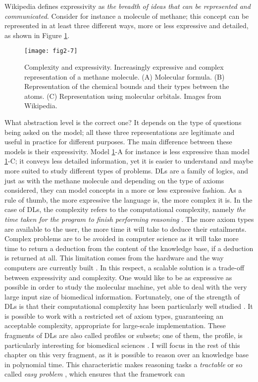 Wikipedia defines expressivity as \emph{the breadth of ideas that can be represented and communicated}. Consider for instance a molecule of methane; this concept can be represented in at least three different ways, more or less expressive and detailed, as shown in Figure \ref{fig2-7}.

\begin{figure}[ht]
    \centering
    \texttt{[image: fig2-7]}
    \caption{Complexity and expressivity. Increasingly expressive and complex representation of a methane molecule. (A) Molecular formula. (B) Representation of the chemical bounds and their types between the atoms. (C) Representation using molecular orbitals. Images from Wikipedia.}
    \label{fig2-7}
\end{figure}

What abstraction level is the correct one? It depends on the type of questions being asked on the model; all these three representations are legitimate and useful in practice for different purposes. The main difference between these models is their expressivity. Model \ref{fig2-7}-A for instance is less expressive than model \ref{fig2-7}-C; it conveys less detailed information, yet it is easier to understand and maybe more suited to study different types of problems. DLs are a family of logics, and just as with the methane molecule and depending on the type of axioms considered, they can model concepts in a more or less expressive fashion. As a rule of thumb, the more expressive the language is, the more complex it is. In the case of DLs, the complexity refers to the computational complexity, namely \emph{the time taken for the program to finish performing reasoning} \citep{krotzsch2012owl}. The more axiom types are available to the user, the more time it will take to deduce their entailments. Complex problems are to be avoided in computer science as it will take more time to return a deduction from the content of the knowledge base, if a deduction is returned at all. This limitation comes from the hardware and the way computers are currently built \citep{turing1950computing} \citep{neumann1966theory}. In this respect, a scalable solution is a trade-off between expressivity and complexity. One would like to be as expressive as possible in order to study the molecular machine, yet able to deal with the very large input size of biomedical information. Fortunately, one of the strength of DLs is that their computational complexity has been particularly well studied \citep{computationalprop} \citep{ter2005completeness}. It is possible to work with a restricted set of axiom types, guaranteeing an acceptable complexity, appropriate for large-scale implementation. These fragments of DLs are also called profiles or subsets; one of them, the  profile, is particularly interesting for biomedical sciences \citep{baader2005pushing} \citep{baader2008pushing} \citep{hoehndorf2011common}. I will focus in the rest of this chapter on this very fragment, as it is possible to reason over an  knowledge base in polynomial time. This characteristic makes reasoning tasks a \emph{tractable} or so called \emph{easy problem} \citep{cobham1965intrinsic}, which ensures that the framework can 